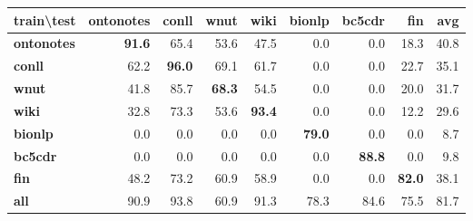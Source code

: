 \documentclass[11pt,a4paper]{article}
\begin{document}
\begin{table*}[ht]
\centering
\begin{tabular}{l|rrrrrrr|r}
\hline
\textbf{train\textbackslash{}test} & \textbf{ontonotes}  & \textbf{conll}     & \textbf{wnut}     & \textbf{wiki}             & \textbf{bionlp}    & \textbf{bc5cdr} & \textbf{fin}   & \textbf{avg} \\  \hline
\textbf{ontonotes} & \textbf{91.6}      & 65.4              & 53.6             & 47.5                     & 0.0                   & 0.0               & 18.3          & 40.8 \\ \hline
\textbf{conll}     & 62.2               & \textbf{96.0}     & 69.1             & 61.7                      & 0.0                   & 0.0               & 22.7          & 35.1 \\ \hline
\textbf{wnut}      & 41.8               & 85.7               & \textbf{68.3}    & 54.5                     & 0.0                   & 0.0               & 20.0          & 31.7 \\ \hline
\textbf{wiki}      & 32.8               & 73.3              & 53.6             & \textbf{93.4}            & 0.0                   & 0.0               & 12.2          & 29.6 \\ \hline
\textbf{bionlp}    & 0.0                   & 0.0                  & 0.0                 & 0.0                         & \textbf{79.0}      & 0.0               & 0.0              & 8.7 \\ \hline
\textbf{bc5cdr}    & 0.0                   & 0.0                  & 0.0                 & 0.0                         & 0.0                   & \textbf{88.8}  & 0.0              & 9.8 \\ \hline
\textbf{fin}       & 48.2               & 73.2              & 60.9             & 58.9                     & 0.0                   & 0.0               & \textbf{82.0} & 38.1 \\ \hline\hline
\textbf{all}       & 90.9               & 93.8              & 60.9             & 91.3                     & 78.3               & 84.6           & 75.5          & 81.7 \\ \hline
\end{tabular}
\caption{\label{cross-domain-result}
{\it Type-ignored} F1 score in cross-domain setting over non-lower-cased English datasets.
We compute average of accuracy in each test set, named as {\bf avg}. The model trained on all datasets listed here, is shown as {\bf all}.
}
\end{table*}
\end{document}
